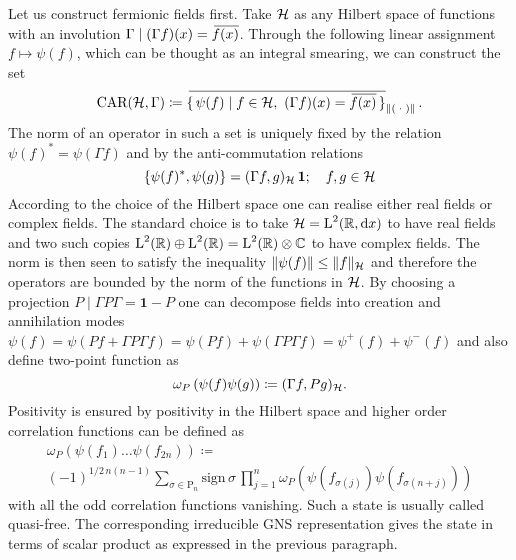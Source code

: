 \bigskip
Let us construct fermionic fields first. Take $\mathcal{H}$ as 
any Hilbert space of functions with an involution 
$\Gamma\mid(\Gamma f)(x)={}\mkern3mu\overline{\mkern-3muf(x)}$. Through the 
following linear assignment $f\mapsto\psi(f)$, which 
can be thought as an integral smearing, we can construct 
the set
\[
\textrm{CAR}(\hil,\Gamma)\coloneqq
\conj{\set{\psi(f)\mid f\in \mathcal{\hil},\ 
(\Gamma f)(x)=\conj{f(x)}}}_{\norm{\blank}}\,.
\]
The norm of an operator in such a set is uniquely fixed by the relation
$\psi(f)^*=\psi(\Gamma f)$ and by the anti-commutation relations
\begin{equation}
\label{CAR}
\{\psi(f)^*,\psi(g)\}=(\Gamma f,g)_{\mathcal{H}}\,\bm{1};\quad
f,g\in\mathcal{H}
\end{equation}
According to the choice of the Hilbert space one can realise either
real fields or complex fields. The standard choice is to take
$\mathcal{H} = \textrm{L}^2(\mathbb{R},\textrm{d} x)$ to have real fields and two such copies
$\textrm{L}^2(\mathbb{R})\oplus\textrm{L}^2(\mathbb{R}) = \textrm{L}^2(\mathbb{R})\otimes\mathbb{C}$ to have complex fields.
The norm is then seen to satisfy the inequality $\lVert\psi(f)\rVert
\leq \lVert f\rVert_{\mathcal{H}}$ and therefore the operators are
bounded by the norm of the functions in $\mathcal{H}$. By choosing
a projection $P\mid \Gamma P\Gamma=\bm{1}-P$ one can decompose
fields into creation and annihilation modes
$\psi(f)=\psi\left(Pf + \Gamma P\Gamma f\right)=
\psi(Pf)+\psi(\Gamma P\Gamma f)=\psi^+(f)+\psi^-(f)$
and also define two-point function as
\[
\omega_{P}\left(\psi(f)\psi(g)\right)\coloneqq
(\Gamma f, P g)_{\mathcal{H}}.
\]
Positivity is ensured by positivity in the Hilbert space
and higher order correlation functions can be defined 
\cite{Boeck:1996} as
\begin{multline}
\label{wick}
\omega_P\left(\psi(f_1)\ldots\psi(f_{2n})\right)\coloneqq\\
{(-1)}^{1/2\,n(n-1)}\sum_{\sigma\in \textrm{P}_n}\textrm{sign}\,
\sigma\,\prod^n_{j=1}\omega_P
\left(\psi(f_{\sigma(j)})\psi(f_{\sigma(n+j)})\right)
\end{multline}
with all the odd correlation functions vanishing. Such a state is
usually called quasi-free. The corresponding irreducible GNS 
representation gives the state in terms of scalar product as
expressed in the previous paragraph.
